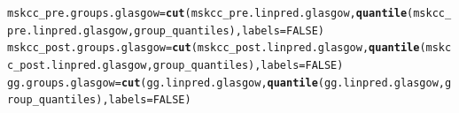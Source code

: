 \documentclass{article}\usepackage[]{graphicx}\usepackage[]{color}
\makeatletter
\newcommand{\hlnum}[1]{\textcolor[rgb]{0.686,0.059,0.569}{#1}}%
\newcommand{\hlstd}[1]{\textcolor[rgb]{0.345,0.345,0.345}{#1}}%
\newcommand{\hlkwb}[1]{\textcolor[rgb]{0.69,0.353,0.396}{#1}}%
\newcommand{\hlkwc}[1]{\textcolor[rgb]{0.333,0.667,0.333}{#1}}%
\newcommand{\hlkwd}[1]{\textcolor[rgb]{0.737,0.353,0.396}{\textbf{#1}}}%
\newenvironment{kframe}{%
 \def\at@end@of@kframe{}%
 \ifinner\ifhmode%
  \def\at@end@of@kframe{\end{minipage}}%
  \begin{minipage}{\columnwidth}%
 \fi\fi%
 \def\FrameCommand##1{\hskip\@totalleftmargin \hskip-\fboxsep
 \colorbox{shadecolor}{##1}\hskip-\fboxsep
     \hskip-\linewidth \hskip-\@totalleftmargin \hskip\columnwidth}%
 \MakeFramed {\advance\hsize-\width
   \@totalleftmargin\z@ \linewidth\hsize
   \@setminipage}}%
 {\par\unskip\endMakeFramed%
 \at@end@of@kframe}
\newenvironment{knitrout}{}{} %
\makeatother
\begin{document}
\begin{knitrout}
\color{fgcolor}\begin{kframe}
\begin{alltt}
\hlstd{mskcc_pre.groups.glasgow} \hlkwb{=} \hlkwd{cut}\hlstd{(mskcc_pre.linpred.glasgow,} \hlkwd{quantile}\hlstd{(mskcc_pre.linpred.glasgow, group_quantiles),} \hlkwc{labels} \hlstd{=} \hlnum{FALSE}\hlstd{)}
\hlstd{mskcc_post.groups.glasgow} \hlkwb{=} \hlkwd{cut}\hlstd{(mskcc_post.linpred.glasgow,} \hlkwd{quantile}\hlstd{(mskcc_post.linpred.glasgow, group_quantiles),} \hlkwc{labels} \hlstd{=} \hlnum{FALSE}\hlstd{)}
\hlstd{gg.groups.glasgow} \hlkwb{=} \hlkwd{cut}\hlstd{(gg.linpred.glasgow,} \hlkwd{quantile}\hlstd{(gg.linpred.glasgow, group_quantiles),} \hlkwc{labels} \hlstd{=} \hlnum{FALSE}\hlstd{)}


\end{alltt}
\end{kframe}
\end{knitrout}
\end{document}
